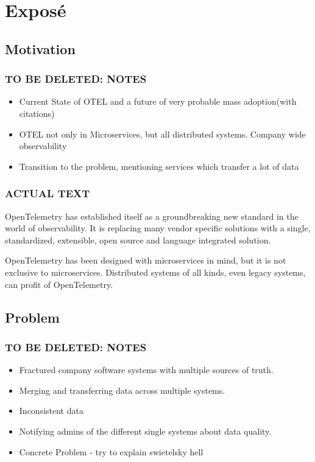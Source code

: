 \chapter{Exposé}

\section{Motivation}

\subsection{TO BE DELETED: NOTES}

\begin{itemize}
	\item Current State of OTEL and a future of very probable mass adoption(with citations)
	\item OTEL not only in Microservices, but all distributed systems. Company wide observability
	\item Transition to the problem, mentioning services which transfer a lot of data
\end{itemize}

\subsection{ACTUAL TEXT}

OpenTelemetry has established itself as a groundbreaking new standard in the world of observability.
It is replacing many vendor specific solutions with a single, standardized, extensible, open source
and language integrated solution.

OpenTelemetry has been designed with microservices in mind, but it is not exclusive to microservices.
Distributed systems of all kinds, even legacy systems, can profit of OpenTelemetry. 

\section{Problem}

\subsection{TO BE DELETED: NOTES}

\begin{itemize}
	\item Fractured company software systems with multiple sources of truth.
	\item Merging and transferring data across multiple systems.
	\item Inconsistent data
	\item Notifying admins of the different single systems about data quality.
	\item Concrete Problem - try to explain swietelsky hell
\end{itemize}


